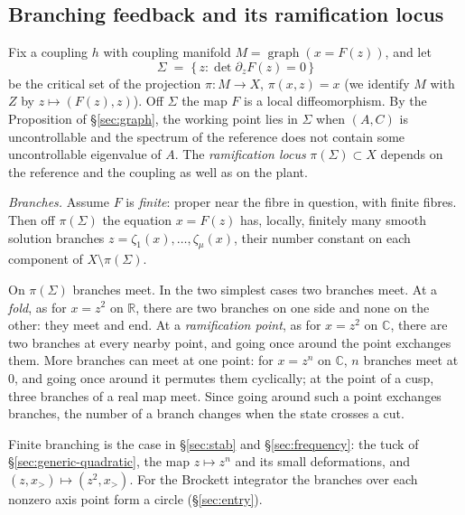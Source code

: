 \documentclass[11pt,reqno]{amsart}
\theoremstyle{plain}
\theoremstyle{definition}
\theoremstyle{remark}
\DeclareMathOperator{\graph}{graph}
\newcommand{\R}{\mathbb{R}}
\newcommand{\C}{\mathbb{C}}
\newcommand{\Sig}{\Sigma}
\begin{document}
\subsection{Branching feedback and its ramification locus}\label{sec:core}
Fix a coupling $h$ with coupling manifold $M=\graph(x=F(z))$, and let
\begin{equation}\label{eq:Sigma}
  \Sig \;=\; \{\, z : \det\partial_z F(z)=0 \,\}
\end{equation}
be the critical set of the projection $\pi\colon M\to X$, $\pi(x,z)=x$ (we identify $M$ with $Z$ by
$z\mapsto(F(z),z)$). Off $\Sig$ the map $F$ is a local
diffeomorphism. By the Proposition of \S\ref{sec:graph}, the working point lies in $\Sig$ when $(A,C)$ is
uncontrollable and the spectrum of the reference does not contain some uncontrollable eigenvalue of $A$. The
\emph{ramification locus} $\pi(\Sig)\subset X$ depends on the reference and the coupling as well as on the plant.

\emph{Branches.} Assume $F$ is \emph{finite}: proper near the fibre in question, with finite fibres. Then off
$\pi(\Sig)$ the equation $x=F(z)$ has, locally, finitely many smooth solution branches
$z=\zeta_1(x),\dots,\zeta_\mu(x)$, their number constant on each component of $X\setminus\pi(\Sig)$.

On $\pi(\Sig)$ branches meet. In the two simplest
cases two branches meet. At a \emph{fold}, as for $x=z^{2}$ on $\R$, there are two branches on one side and none on the other: they
meet and end. At a \emph{ramification point}, as for $x=z^{2}$ on $\C$, there are two branches at every nearby point,
and going once around the point exchanges them. More branches can meet at one point: for $x=z^{n}$ on $\C$, $n$
branches meet at $0$, and going once around it permutes them cyclically; at the point of a cusp, three branches
of a real map meet. Since going around such a point exchanges branches, the number of a branch changes when the state crosses a cut.

Finite branching is the case in \S\ref{sec:stab} and
\S\ref{sec:frequency}: the tuck of \S\ref{sec:generic-quadratic}, the map $z\mapsto z^{n}$ and its small
deformations, and $(z,x_>)\mapsto(z^{2},x_>)$. For the Brockett integrator the branches over each nonzero axis point form a circle (\S\ref{sec:entry}).
\end{document}
